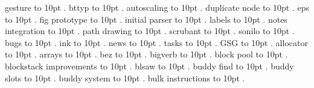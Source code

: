 
\pdfpagewidth=148mm
\pdfpageheight=210mm
\hsize=128mm
\vsize=190mm

\pdfhorigin=0pt
\pdfvorigin=0pt
\hoffset=10mm
\voffset=10mm
\noindent gesture \leaders\hbox to 10pt {\hss.\hss}  \hfill {}
\smallskip
\noindent bttyp \leaders\hbox to 10pt {\hss.\hss}  \hfill {}
\smallskip
\noindent autoscaling \leaders\hbox to 10pt {\hss.\hss}  \hfill {}
\smallskip
\noindent duplicate node \leaders\hbox to 10pt {\hss.\hss}  \hfill {}
\smallskip
\noindent eps \leaders\hbox to 10pt {\hss.\hss}  \hfill {}
\smallskip
\noindent fig prototype \leaders\hbox to 10pt {\hss.\hss}  \hfill {}
\smallskip
\noindent initial parser \leaders\hbox to 10pt {\hss.\hss}  \hfill {}
\smallskip
\noindent labels \leaders\hbox to 10pt {\hss.\hss}  \hfill {}
\smallskip
\noindent notes integration \leaders\hbox to 10pt {\hss.\hss}  \hfill {}
\smallskip
\noindent path drawing \leaders\hbox to 10pt {\hss.\hss}  \hfill {}
\smallskip
\noindent scrubant \leaders\hbox to 10pt {\hss.\hss}  \hfill {}
\smallskip
\noindent sonilo \leaders\hbox to 10pt {\hss.\hss}  \hfill {}
\smallskip
\noindent bugs \leaders\hbox to 10pt {\hss.\hss}  \hfill {}
\smallskip
\noindent ink \leaders\hbox to 10pt {\hss.\hss}  \hfill {}
\smallskip
\noindent news \leaders\hbox to 10pt {\hss.\hss}  \hfill {}
\smallskip
\noindent tasks \leaders\hbox to 10pt {\hss.\hss}  \hfill {}
\smallskip
\noindent GSG \leaders\hbox to 10pt {\hss.\hss}  \hfill {}
\smallskip
\noindent allocator \leaders\hbox to 10pt {\hss.\hss}  \hfill {}
\smallskip
\noindent arrays \leaders\hbox to 10pt {\hss.\hss}  \hfill {}
\smallskip
\noindent bez \leaders\hbox to 10pt {\hss.\hss}  \hfill {}
\smallskip
\noindent bigverb \leaders\hbox to 10pt {\hss.\hss}  \hfill {}
\smallskip
\noindent block pool \leaders\hbox to 10pt {\hss.\hss}  \hfill {}
\smallskip
\noindent blockstack improvements \leaders\hbox to 10pt {\hss.\hss}  \hfill {}
\smallskip
\noindent blsaw \leaders\hbox to 10pt {\hss.\hss}  \hfill {}
\smallskip
\noindent buddy find \leaders\hbox to 10pt {\hss.\hss}  \hfill {}
\smallskip
\noindent buddy slots \leaders\hbox to 10pt {\hss.\hss}  \hfill {}
\smallskip
\noindent buddy system \leaders\hbox to 10pt {\hss.\hss}  \hfill {}
\smallskip
\noindent bulk instructions \leaders\hbox to 10pt {\hss.\hss}  \hfill {}
